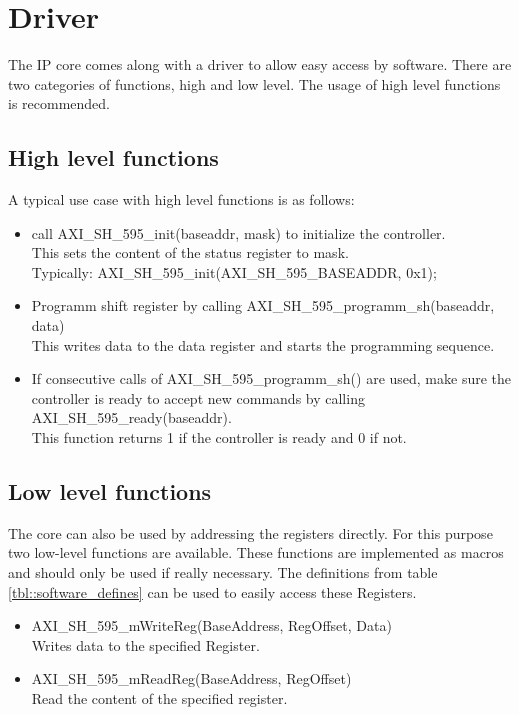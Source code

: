 \section{Driver}
\label{sec::driver}

The IP core comes along with a driver to allow easy access by software.
There are two categories of functions, high and low level.
The usage of high level functions is recommended.

\subsection{High level functions}
A typical use case with high level functions is as follows:
\begin{itemize}
	\item call AXI\_SH\_595\_init(baseaddr, mask) to initialize the controller. \\
		This sets the content of the status register to mask. \\
		Typically: AXI\_SH\_595\_init(AXI\_SH\_595\_BASEADDR, 0x1);
	\item Programm shift register by calling AXI\_SH\_595\_programm\_sh(baseaddr, data) \\
		This writes data to the data register and starts the programming sequence.
	\item If consecutive calls of AXI\_SH\_595\_programm\_sh() are used, make sure the controller is ready to accept new commands by calling AXI\_SH\_595\_ready(baseaddr). \\
	This function returns 1 if the controller is ready and 0 if not.
\end{itemize}

\subsection{Low level functions}
The core can also be used by addressing the registers directly.
For this purpose two low-level functions are available.
These functions are implemented as macros and should only be used if really necessary.
The definitions from table \ref{tbl::software_defines} can be used to easily access these Registers.

\begin{itemize}
	\item AXI\_SH\_595\_mWriteReg(BaseAddress, RegOffset, Data) \\
		Writes data to the specified Register. 
	\item AXI\_SH\_595\_mReadReg(BaseAddress, RegOffset) \\		
		Read the content of the specified register.
\end{itemize}

